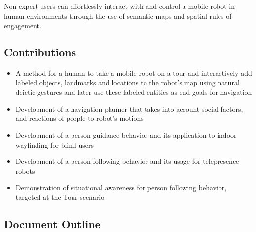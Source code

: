 \documentclass[12pt]{gatech-thesis}
\begin{document}
Non-expert users can effortlessly interact with and control a mobile robot in human environments through the use of semantic maps and spatial rules of engagement.

\subsection{Contributions}

\begin{itemize}
\item A method for a human to take a mobile robot on a tour and interactively add labeled objects, landmarks and locations to the robot's map using natural deictic gestures and later use these labeled entities as end goals for navigation
\item Development of a navigation planner that takes into account social factors, and reactions of people to robot's motions
\item Development of a person guidance behavior and its application to indoor wayfinding for blind users
\item Development of a person following behavior and its usage for telepresence robots
\item Demonstration of situational awareness for person following behavior, targeted at the Tour scenario
\end{itemize}


\subsection{Document Outline}





\end{document}
